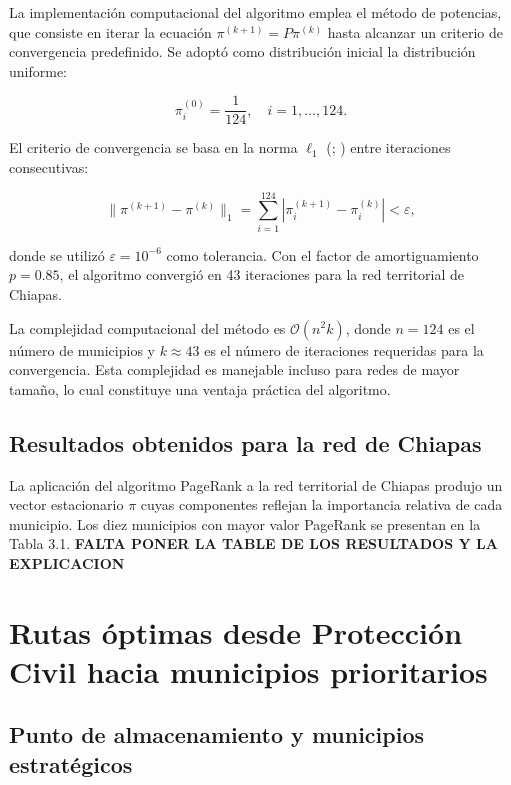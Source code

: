 \documentclass[
  spanish,
  us-letterpaper,
]{scrreprt}
\numberwithin{equation}{section}
\begin{document}
La implementación computacional del algoritmo emplea el método de
potencias, que consiste en iterar la ecuación
\(\pi^{(k+1)} = P\pi^{(k)}\) hasta alcanzar un criterio de convergencia
predefinido. Se adoptó como distribución inicial la distribución
uniforme:

\[
\pi^{(0)}_i = \frac{1}{124}, \quad i = 1, \dots, 124.
\]

El criterio de convergencia se basa en la norma \(\ell_1\)
(;
) entre
iteraciones consecutivas:

\[
\|\pi^{(k+1)} - \pi^{(k)}\|_1 = \sum_{i=1}^{124} |\pi^{(k+1)}_i - \pi^{(k)}_i| < \varepsilon,
\]

donde se utilizó \(\varepsilon = 10^{-6}\) como tolerancia. Con el
factor de amortiguamiento \(p = 0.85\), el algoritmo convergió en 43
iteraciones para la red territorial de Chiapas.

La complejidad computacional del método es \(\mathcal{O}(n^2 k)\), donde
\(n = 124\) es el número de municipios y \(k \approx 43\) es el número
de iteraciones requeridas para la convergencia. Esta complejidad es
manejable incluso para redes de mayor tamaño, lo cual constituye una
ventaja práctica del algoritmo.

\subsection{Resultados obtenidos para la red de
Chiapas}\label{resultados-obtenidos-para-la-red-de-chiapas}

La aplicación del algoritmo PageRank a la red territorial de Chiapas
produjo un vector estacionario \(\pi\) cuyas componentes reflejan la
importancia relativa de cada municipio. Los diez municipios con mayor
valor PageRank se presentan en la Tabla 3.1. \textbf{FALTA PONER LA
TABLE DE LOS RESULTADOS Y LA EXPLICACION}

\section{Rutas óptimas desde Protección Civil hacia municipios
prioritarios}\label{rutas-uxf3ptimas-desde-protecciuxf3n-civil-hacia-municipios-prioritarios}

\subsection{Punto de almacenamiento y municipios
estratégicos}\label{punto-de-almacenamiento-y-municipios-estratuxe9gicos}
\end{document}
